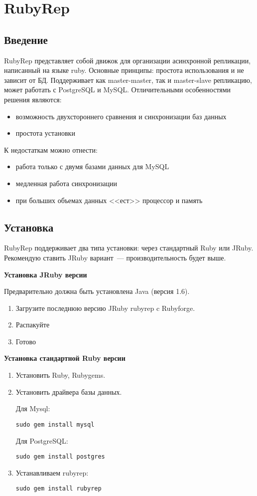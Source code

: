 \section{RubyRep}
\subsection{Введение}
RubyRep представляет собой движок для организации асинхронной репликации, написанный на языке ruby.
Основные принципы: простота использования и не зависит от БД.
Поддерживает как master-master, так и master-slave репликацию, может работать с PostgreSQL и MySQL.
Отличительными особенностями решения являются:
\begin{itemize}
\item возможность двухстороннего сравнения и синхронизации баз данных
\item простота установки
\end{itemize}
К недостаткам можно отнести:
\begin{itemize}
\item работа только с двумя базами данных для MySQL
\item медленная работа синхронизации
\item при больших объемах данных <<ест>> процессор и память
\end{itemize}


\subsection{Установка}
RubyRep поддерживает два типа установки: через стандартный Ruby или JRuby.
Рекомендую ставить JRuby вариант~--- производительность будет выше.

\textbf{Установка JRuby версии}

Предварительно должна быть установлена Java (версия 1.6).
\begin{enumerate}
 \item Загрузите последнюю версию JRuby rubyrep c Rubyforge.
 \item Распакуйте
 \item Готово
\end{enumerate}

\textbf{Установка стандартной Ruby версии}
\begin{enumerate}
\item Установить Ruby, Rubygems.
\item Установить драйвера базы данных.

Для Mysql:
\begin{lstlisting}[label=lst:rubyrep1,caption=Установка]
sudo gem install mysql
\end{lstlisting}

Для PostgreSQL:
\begin{lstlisting}[label=lst:rubyrep2,caption=Установка]
sudo gem install postgres
\end{lstlisting}

\item Устанавливаем rubyrep:
\begin{lstlisting}[label=lst:rubyrep3,caption=Установка]
sudo gem install rubyrep
\end{lstlisting}
\end{enumerate}


